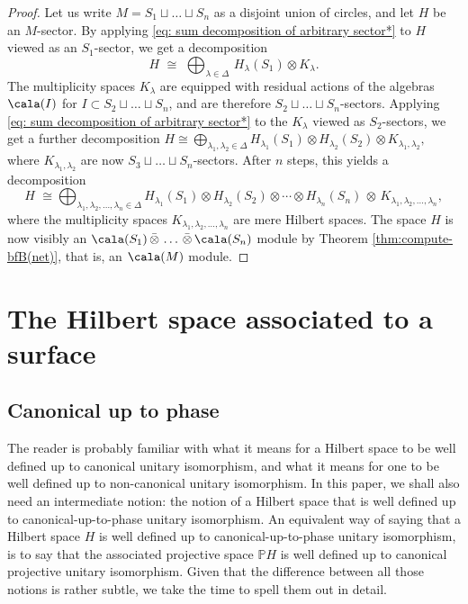 \documentclass[a4paper,10pt,leqno]{amsart}
\newcommand{\IP}{\mathbb{P}}     \newcommand{\calp}{\mathcal{P}}
\theoremstyle{plain}
\theoremstyle{definition}
\theoremstyle{remark}
\begin{document}
\begin{proof}
Let us write $M=S_1\sqcup\ldots\sqcup S_n$ as a disjoint union of circles, and let $H$ be an $M$-sector.
By applying \eqref{eq: sum decomposition of arbitrary sector*} to $H$ viewed as an $S_1$-sector, we get a decomposition
\[
H \,\,\cong\,\, \bigoplus_{\lambda\in \Delta}\, H_\lambda(S_1)\otimes K_\lambda.
\]
The multiplicity spaces $K_\lambda$ are equipped with residual actions of the algebras $\cala(I)$ for $I\subset S_2\sqcup\ldots\sqcup S_n$, 
and are therefore $S_2\sqcup\ldots\sqcup S_n$-sectors.
Applying \eqref{eq: sum decomposition of arbitrary sector*} to the $K_\lambda$ viewed as $S_2$-sectors, we get a further decomposition
\(
H \cong \bigoplus_{\lambda_1,\lambda_2\in \Delta} H_{\lambda_1}(S_1)\otimes H_{\lambda_2}(S_2)\otimes K_{\lambda_1,\lambda_2},
\)
where $K_{\lambda_1,\lambda_2}$ are now $S_3\sqcup\ldots\sqcup S_n$-sectors.
After $n$ steps, this yields a decomposition
\[
H \,\,\cong \bigoplus_{\lambda_1,\lambda_2,\ldots,\lambda_n\in \Delta} H_{\lambda_1}(S_1)\otimes H_{\lambda_2}(S_2)\otimes\cdots\otimes H_{\lambda_n}(S_n)\,\otimes\, K_{\lambda_1,\lambda_2,\ldots,\lambda_n},
\]
where the multiplicity spaces $K_{\lambda_1,\lambda_2,\ldots,\lambda_n}$ are mere Hilbert spaces.
The space $H$ is now visibly an $\cala(S_1)\,\bar\otimes\,\ldots\,\bar\otimes\,\cala(S_n)$ module by Theorem \ref{thm:compute-bfB(net)},
that is, an $\cala(M)$ module.
\end{proof}





\section{The Hilbert space associated to a surface}

\subsection{Canonical up to phase}\label{sec: ``up to non-canonical isomorphism''}
The reader is probably familiar with what it means for a Hilbert space to be well defined up to canonical unitary isomorphism,
and what it means for one to be well defined up to non-canonical unitary isomorphism.
In this paper, we shall also need an intermediate notion: the notion of a Hilbert space that is well defined up to canonical-up-to-phase unitary isomorphism.
An equivalent way of saying that a Hilbert space $H$ is well defined up to canonical-up-to-phase unitary isomorphism,
is to say that the associated projective space $\IP H$ is well defined up to canonical projective unitary isomorphism.
Given that the difference between all those notions is rather subtle, we take the time to spell them out in detail.
\end{document}
